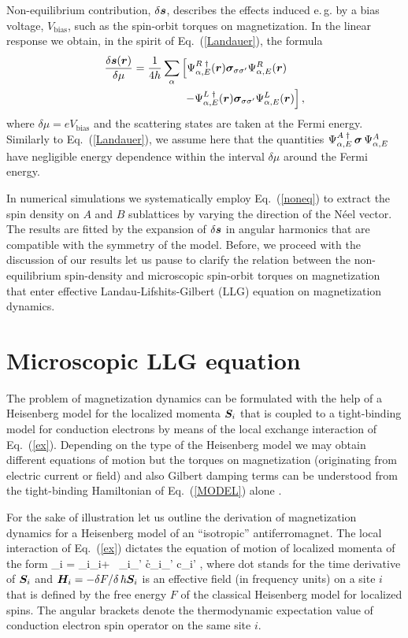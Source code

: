 Non-equilibrium contribution, $\delta\boldsymbol{s}$, describes the effects induced e.\,g. by a bias voltage, $V_\textrm{bias}$, such as the spin-orbit torques on magnetization. In the linear response we obtain, in the spirit of Eq.~(\ref{Landauer}), the formula
\begin{align}
\frac{\delta\boldsymbol{s}(\boldsymbol{r})}{\delta\mu} =  \frac{1}{4h} \sum_{\alpha}  &\left[\Psi^{R\;\dagger}_{\alpha,E}(\boldsymbol{r}) \boldsymbol{\sigma}_{\sigma\sigma'} \Psi^{R}_{\alpha,E}(\boldsymbol{r}) \right. \nonumber\\
&\; \left. - \Psi^{L\;\dagger}_{\alpha,E}(\boldsymbol{r}) \boldsymbol{\sigma}_{\sigma\sigma'} \Psi^{L}_{\alpha,E}(\boldsymbol{r}) \right],
\label{noneq}
\end{align}
where $\delta\mu=eV_\textrm{bias}$ and the scattering states are taken at the Fermi energy.  Similarly to Eq.~(\ref{Landauer}), we assume here that the quantities $\Psi^{A\;\dagger}_{\alpha,E} \,\boldsymbol{\sigma}\, \Psi^{A}_{\alpha,E}$  have negligible energy dependence within the interval $\delta\mu$ around the Fermi energy. 

In numerical simulations we systematically employ Eq.~(\ref{noneq}) to extract the spin density on $A$ and $B$ sublattices by varying the direction of the N\'eel vector. The results are fitted by the expansion of $\delta\boldsymbol{s}$ in angular harmonics that are compatible with the symmetry of the model. Before, we proceed with the discussion of our results let us pause to clarify the relation between the non-equilibrium spin-density and microscopic spin-orbit torques on magnetization that enter effective Landau-Lifshits-Gilbert (LLG) equation on magnetization dynamics.

\section{Microscopic LLG equation} 

The problem of magnetization dynamics can be formulated with the help of a Heisenberg model for the localized momenta $\boldsymbol{S}_i$ that is coupled to a tight-binding model for conduction electrons by means of the local exchange interaction of Eq.~(\ref{ex}). Depending on the type of the Heisenberg model we may obtain different equations of motion but the torques on magnetization (originating from electric current or field) and also Gilbert damping terms can be understood from the tight-binding Hamiltonian of Eq.~(\ref{MODEL}) alone \cite{AdoSTTGD2019}. 

For the sake of illustration let us outline the derivation of magnetization dynamics for a Heisenberg model of an ``isotropic'' antiferromagnet. The local interaction of Eq.~(\ref{ex}) dictates the equation of motion of localized momenta of the form
\be
\label{EOM}
_i = _i\times {}_i+ \, _i\times \s_{\sigma\sigma'} \lt\la c\h_{i\sigma}\bb{\sigma}_{\sigma\sigma'} c\0_{i\sigma'} \rt\ra,
\e
where dot stands for the time derivative of $\boldsymbol{S}_i$ and $\boldsymbol{H}_i=-\delta F/ \delta\, \hbar\boldsymbol{S}_i$ is an effective field (in frequency units) on a site $i$  that is defined by the free energy $F$ of the classical Heisenberg model for localized spins. The angular brackets denote the thermodynamic expectation value of conduction electron spin operator on the same site $i$. 


